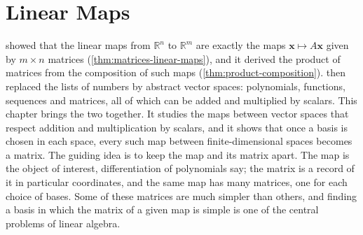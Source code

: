\chapter{Linear Maps}
\label{ch:linear-maps}


 showed that the linear maps from $\mathbb R^n$ to $\mathbb R^m$ are exactly the maps $\mathbf x\mapsto A\mathbf x$ given by $m\times n$ matrices (\cref{thm:matrices-linear-maps}), and it derived the product of matrices from the composition of such maps (\cref{thm:product-composition}).  then replaced the lists of numbers by abstract vector spaces: polynomials, functions, sequences and matrices, all of which can be added and multiplied by scalars. This chapter brings the two together. It studies the maps between vector spaces that respect addition and multiplication by scalars, and it shows that once a basis is chosen in each space, every such map between finite-dimensional spaces becomes a matrix. The guiding idea is to keep the map and its matrix apart. The map is the object of interest, differentiation of polynomials say; the matrix is a record of it in particular coordinates, and the same map has many matrices, one for each choice of bases. Some of these matrices are much simpler than others, and finding a basis in which the matrix of a given map is simple is one of the central problems of linear algebra.

